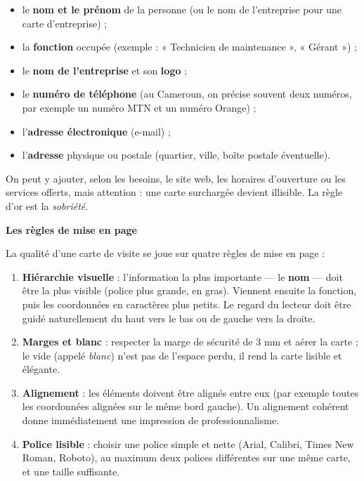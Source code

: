 \documentclass[11pt]{article}
\begin{document}
\begin{itemize}
\item le \textbf{nom et le prénom} de la personne (ou le nom de l'entreprise pour une carte d'entreprise) ;
\item la \textbf{fonction} occupée (exemple : « Technicien de maintenance », « Gérant ») ;
\item le \textbf{nom de l'entreprise} et son \textbf{logo} ;
\item le \textbf{numéro de téléphone} (au Cameroun, on précise souvent deux numéros, par exemple un numéro MTN et un numéro Orange) ;
\item l'\textbf{adresse électronique} (e-mail) ;
\item l'\textbf{adresse} physique ou postale (quartier, ville, boîte postale éventuelle).
\end{itemize}

On peut y ajouter, selon les besoins, le site web, les horaires d'ouverture ou les services offerts, mais attention : une carte surchargée devient illisible. La règle d'or est la \emph{sobriété}.

\textbf{Les règles de mise en page}

La qualité d'une carte de visite se joue sur quatre règles de mise en page :

\begin{enumerate}
\item \textbf{Hiérarchie visuelle} : l'information la plus importante — le \textbf{nom} — doit être la plus visible (police plus grande, en gras). Viennent ensuite la fonction, puis les coordonnées en caractères plus petits. Le regard du lecteur doit être guidé naturellement du haut vers le bas ou de gauche vers la droite.
\item \textbf{Marges et blanc} : respecter la marge de sécurité de 3 mm et aérer la carte ; le vide (appelé \emph{blanc}) n'est pas de l'espace perdu, il rend la carte lisible et élégante.
\item \textbf{Alignement} : les éléments doivent être alignés entre eux (par exemple toutes les coordonnées alignées sur le même bord gauche). Un alignement cohérent donne immédiatement une impression de professionnalisme.
\item \textbf{Police lisible} : choisir une police simple et nette (Arial, Calibri, Times New Roman, Roboto), au maximum deux polices différentes sur une même carte, et une taille suffisante.
\end{enumerate}
\end{document}
